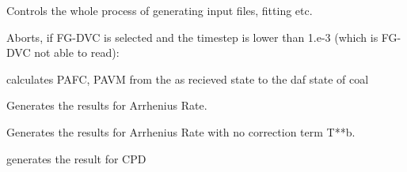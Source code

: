 \documentclass[letterpaper,10pt,english]{sphinxmanual}
\begin{document}
\begin{fulllineitems}
\label{MainProgramCode:Pyrolysis.MainProcess}
Controls the whole process of generating input files, fitting etc.

\begin{fulllineitems}
\label{MainProgramCode:Pyrolysis.MainProcess.CheckFGdt}
Aborts, if FG-DVC is selected and the timestep is lower than 1.e-3 (which is FG-DVC not able to read):

\end{fulllineitems}


\begin{fulllineitems}
\label{MainProgramCode:Pyrolysis.MainProcess.DAF}
calculates PAFC, PAVM  from the as recieved state to the daf state of coal

\end{fulllineitems}


\begin{fulllineitems}
\label{MainProgramCode:Pyrolysis.MainProcess.MakeResults_Arrh}
Generates the results for Arrhenius Rate.

\end{fulllineitems}


\begin{fulllineitems}
\label{MainProgramCode:Pyrolysis.MainProcess.MakeResults_ArrhNoB}
Generates the results for Arrhenius Rate with no correction term T**b.

\end{fulllineitems}


\begin{fulllineitems}
\label{MainProgramCode:Pyrolysis.MainProcess.MakeResults_CPD}
generates the result for CPD


\end{fulllineitems}
\end{fulllineitems}
\end{document}
